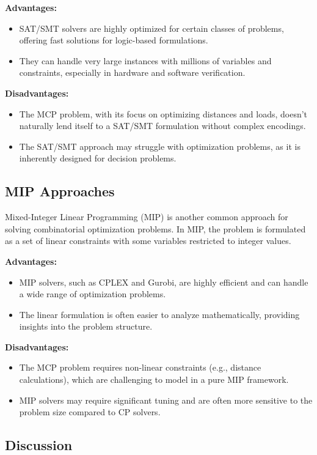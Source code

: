 \documentclass{article}
\begin{document}
\textbf{Advantages:}
\begin{itemize}
    \item SAT/SMT solvers are highly optimized for certain classes of problems, offering fast solutions for logic-based formulations.
    \item They can handle very large instances with millions of variables and constraints, especially in hardware and software verification.
\end{itemize}

\textbf{Disadvantages:}
\begin{itemize}
    \item The MCP problem, with its focus on optimizing distances and loads, doesn't naturally lend itself to a SAT/SMT formulation without complex encodings.
    \item The SAT/SMT approach may struggle with optimization problems, as it is inherently designed for decision problems.
\end{itemize}

\subsection{MIP Approaches}

Mixed-Integer Linear Programming (MIP) is another common approach for solving combinatorial optimization problems. In MIP, the problem is formulated as a set of linear constraints with some variables restricted to integer values.

\textbf{Advantages:}
\begin{itemize}
    \item MIP solvers, such as CPLEX and Gurobi, are highly efficient and can handle a wide range of optimization problems.
    \item The linear formulation is often easier to analyze mathematically, providing insights into the problem structure.
\end{itemize}

\textbf{Disadvantages:}
\begin{itemize}
    \item The MCP problem requires non-linear constraints (e.g., distance calculations), which are challenging to model in a pure MIP framework.
    \item MIP solvers may require significant tuning and are often more sensitive to the problem size compared to CP solvers.
\end{itemize}

\subsection{Discussion}
\end{document}
